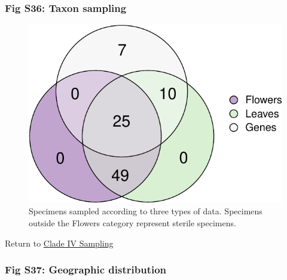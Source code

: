 \documentclass[
  11pt,
]{article}
\begin{document}
\hypertarget{fig-s36-taxon-sampling}{%
\subsubsection{Fig S36: Taxon sampling}\label{fig-s36-taxon-sampling}}

\begin{figure}

{\centering \includegraphics{Supplementary_Material_files/figure-latex/CladeIVVennDiagram-1} 

}

\caption{Specimens sampled according to three types of data. Specimens outside the Flowers category represent sterile specimens.}\label{fig:CladeIVVennDiagram}
\end{figure}

Return to \protect\hyperlink{sampling-4}{Clade IV Sampling}
\pagebreak

\hypertarget{fig-s37-geographic-distribution}{%
\subsubsection{Fig S37: Geographic distribution}\label{fig-s37-geographic-distribution}}
\end{document}
